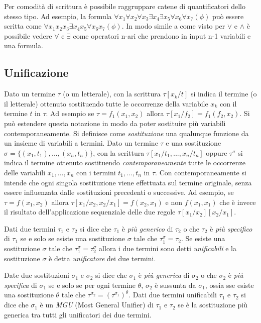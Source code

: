\documentclass[./main.tex]{subfiles}
\begin{document}
Per comodità di scrittura è possibile raggruppare catene di quantificatori dello stesso tipo. Ad esempio, la formula 
$ \forall x_1 \forall x_2 \forall x_3 \exists x_4 \exists x_5 \forall x_6 \forall x_7 (\phi)$ può essere scritta come 
$\forall x_1 x_2 x_3 \exists x_4 x_5 \forall x_6 x_7 (\phi)$. In modo simile a come visto per $\lor$ e $\land$ è possibile vedere
$\forall$ e $\exists$ come operatori n-ari che prendono in input n-1 variabili e una formula.



\subsection{Unificazione}
Dato un termine $\tau$ (o un letterale), con la scrittura $\tau[x_k/t]$ si indica il termine (o il letterale) ottenuto sostituendo
tutte le occorrenze della variabile $x_k$ con il termine $t$ in $\tau$. Ad esempio se $\tau = f_1(x_1, x_2)$ allora $\tau[x_1/f_2] = f_1(f_2, x_2)$.
Si può estendere questa notazione in modo da poter sostituire più variabili contemporaneamente. 
Si definisce come \textit{sostituzione} una qualunque funzione da un insieme di variabili a termini.
Dato un termine $\tau$ e una sostituzione $\sigma = \{(x_1, t_1), ..., (x_n, t_n)\}$,
con la scrittura $\tau[x_1/t_1, ..., x_n/t_n]$ oppure $\tau^\sigma$ si indica il termine ottenuto sostituendo \textit{contemporaneamente} 
tutte le occorrenze delle variabili $x_1, ..., x_n$ con i termini $t_1, ..., t_n$ in $\tau$.
Con contemporaneamente si intende che ogni singola sostituzione viene effettuata sul termine originale, 
senza essere influenzata dalle sostituzioni precedenti o successive.
Ad esempio, se $\tau = f(x_1, x_2)$ allora $\tau[x_1/x_2, x_2/x_1] = f(x_2, x_1)$ e non $f(x_1, x_1)$ 
che è invece il risultato dell'applicazione sequenziale delle due regole $\tau[x_1/x_2][x_2/x_1]$.

Dati due termini $\tau_1$ e $\tau_2$ si dice che $\tau_1$ è \textit{più generico} di $\tau_2$ o che $\tau_2$ è \textit{più specifico} di $\tau_1$
se e solo se esiste una sostituzione $\sigma$ tale che $\tau_1^\sigma = \tau_2$.
Se esiste una sostituzione $\sigma$ tale che $\tau_1^\sigma = \tau_2^\sigma$ allora i due termini sono detti \textit{unificabili} e 
la sostituzione $\sigma$ è detta \textit{unificatore} dei due termini.


Date due sostituzioni $\sigma_1$ e $\sigma_2$ si dice che $\sigma_1$ 
è \textit{più generica} di $\sigma_2$ o che $\sigma_2$ è \textit{più specifica} di $\sigma_1$ se e solo se 
per ogni termine $\theta$, $\sigma_2$ è sussunta da $\sigma_1$, 
ossia sse esiste una sostituzione $\theta$ tale che $\tau^{\sigma_2} = {(\tau^{\sigma_1})}^\theta$.
Dati due termini unificabili $\tau_1$ e $\tau_2$ si dice che $\sigma_1$ è un \textit{MGU} (Most General Unifier) di $\tau_1$ e $\tau_2$ 
se è la sostituzione più generica tra tutti gli unificatori dei due termini.
\end{document}
